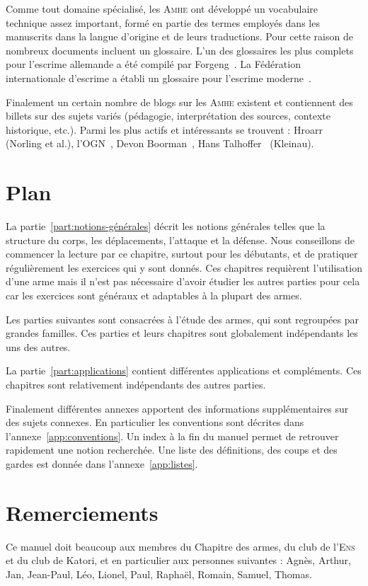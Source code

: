 Comme tout domaine spécialisé, les \textsc{Amhe} ont développé un vocabulaire technique assez important, formé en partie des termes employés dans les manuscrits dans la langue d'origine et de leurs traductions.
Pour cette raison de nombreux documents incluent un glossaire.
L'un des glossaires les plus complets pour l'escrime allemande a été compilé par Forgeng~\cite{Forgeng:2002:WalpurgisFechtbuchRoyal}.
La Fédération internationale d'escrime a établi un glossaire pour l'escrime moderne~\cite{FIE:2014:BrefsGlossairesLescrime}.

Finalement un certain nombre de blogs sur les \textsc{Amhe} existent et contiennent des billets sur des sujets variés (pédagogie, interprétation des sources, contexte historique, etc.).
Parmi les plus actifs et intéressants se trouvent : Hroarr~\cite{Blog:Hroarr} (Norling et al.), l'OGN~\cite{Blog:OGN}, Devon Boorman~\cite{Blog:Boorman}, Hans Talhoffer~\cite{Blog:HansTalhoffer} (Kleinau).


\section{Plan}


La partie~\ref{part:notions-générales} décrit les notions générales telles que la structure du corps, les déplacements, l'attaque et la défense.
Nous conseillons de commencer la lecture par ce chapitre, surtout pour les débutants, et de pratiquer régulièrement les exercices qui y sont donnés.
Ces chapitres requièrent l'utilisation d'une arme mais il n'est pas nécessaire d'avoir étudier les autres parties pour cela car les exercices sont généraux et adaptables à la plupart des armes.

Les parties suivantes sont consacrées à l'étude des armes, qui sont regroupées par grandes familles.
Ces parties et leurs chapitres sont globalement indépendants les uns des autres.

La partie~\ref{part:applications} contient différentes applications et compléments.
Ces chapitres sont relativement indépendants des autres parties.

Finalement différentes annexes apportent des informations supplémentaires sur des sujets connexes.
En particulier les conventions sont décrites dans l'annexe~\ref{app:conventions}.
Un index à la fin du manuel permet de retrouver rapidement une notion recherchée.
Une liste des définitions, des coups et des gardes est donnée dans l'annexe~\ref{app:listes}.



\section{Remerciements}


Ce manuel doit beaucoup aux membres du Chapitre des armes, du club de l'\textsc{Ens} et du club de Katori, et en particulier aux personnes suivantes : Agnès, Arthur, Jan, Jean-Paul, Léo, Lionel, Paul, Raphaël, Romain, Samuel, Thomas.

